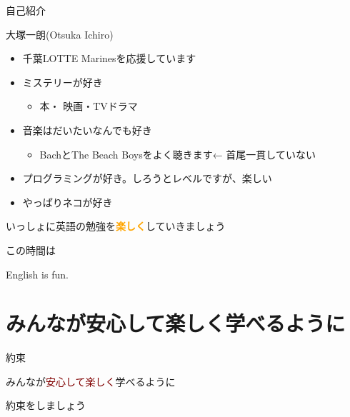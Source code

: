 \documentclass[
  ignorenonframetext,
  aspectratio=169,
  xcolor=dvipsnames]{beamer}
\providecommand{\tightlist}{%
  \setlength{\itemsep}{0pt}\setlength{\parskip}{0pt}}
\begin{document}
\begin{frame}{自己紹介}
\label{ux81eaux5df1ux7d39ux4ecb}
\thispagestyle{empty}
\Large

\pause

大塚一朗(Otsuka Ichiro)

\pause

\begin{itemize}[<+->]
\tightlist
\item
  千葉LOTTE Marinesを応援しています
\item
  ミステリーが好き

  \begin{itemize}[<+->]
  \tightlist
  \item
    本・ 映画・TVドラマ
  \end{itemize}
\item
  音楽はだいたいなんでも好き

  \begin{itemize}[<+->]
  \tightlist
  \item
    BachとThe Beach Boysをよく聴きます\pause  ← 首尾一貫していない
  \end{itemize}
\item
  プログラミングが好き。しろうとレベルですが、楽しい
\item
  やっぱりネコが好き \pause
\end{itemize}

いっしょに英語の勉強を\textcolor{Orange}{\bfseries 楽しく}していきましょう
\end{frame}

\begin{frame}{この時間は}
\label{ux3053ux306eux6642ux9593ux306f}
\Huge

\centering

English is fun.
\end{frame}

\section{みんなが安心して楽しく学べるように}\label{ux307fux3093ux306aux304cux5b89ux5fc3ux3057ux3066ux697dux3057ux304fux5b66ux3079ux308bux3088ux3046ux306b}

\begin{frame}{約束}
\label{ux7d04ux675f}
\LARGE

みんなが\textcolor{Maroon}{安心して楽しく}学べるように

\pause

約束をしましょう
\end{frame}
\end{document}

